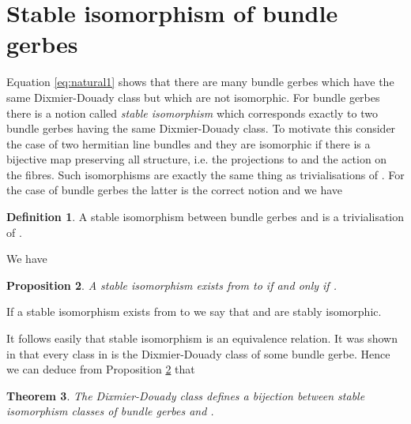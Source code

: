 \documentclass[a4paper,reqno]{amsart}
\theoremstyle{plain}
\newtheorem{theorem}{Theorem}[section]
\newtheorem{proposition}[theorem]{Proposition}
\theoremstyle{definition}
\newtheorem{definition}[theorem]{Definition}
\theoremstyle{remark}
\numberwithin{equation}{section}
\numberwithin{figure}{section}
\providecommand{\ZZ}{{\mathbb Z}}
\providecommand{\<}{\langle}
\renewcommand{\>}{\rangle}
\begin{document}
\section{Stable isomorphism of bundle gerbes}
Equation \eqref{eq:natural1} shows that there are many
bundle gerbes which have the same Dixmier-Douady class but
which  are not isomorphic.
For bundle gerbes there is a  notion called {\em stable isomorphism}
which corresponds exactly to two bundle gerbes having the
same Dixmier-Douady class.  To motivate this consider the case
of two hermitian line bundles \coordHE{} and \coordHE{} they are isomorphic
if there is a bijective map \coordHE{} preserving all structure, i.e. the
projections to \coordHE{} and the \coordHE{} action on the fibres.  Such isomorphisms
are exactly the same thing as trivialisations of \coordHE{}.  For the
case of bundle gerbes the latter is the correct notion and we have
\begin{definition}
\label{def:stableiso}
A stable isomorphism between bundle gerbes  \coordHE{} and \coordHE{}
is a trivialisation of \coordHE{}.
\end{definition}


We  have \cite{MurSte}

\begin{proposition}
\label{prop:stable}
A stable isomorphism exists from  \coordHE{} to \coordHE{}
if and only if \coordHE{}.
\end{proposition}

If a stable isomorphism exists from \coordHE{} to \coordHE{}
we say that \coordHE{} and \coordHE{} are stably isomorphic.

It follows easily that  stable
isomorphism is an equivalence relation.
It was shown in \cite{Mur} that every class in \myHighlight{$H^3(M, \ZZ)$}\coordHE{} is
the Dixmier-Douady class of some bundle gerbe. Hence we can deduce
from Proposition \ref{prop:stable} that
\begin{theorem}
\label{th:stableiso}
The Dixmier-Douady class defines a bijection between
stable isomorphism classes of  bundle gerbes and \myHighlight{$H^3(M, \ZZ)$}\coordHE{}.
\end{theorem}
\end{document}
